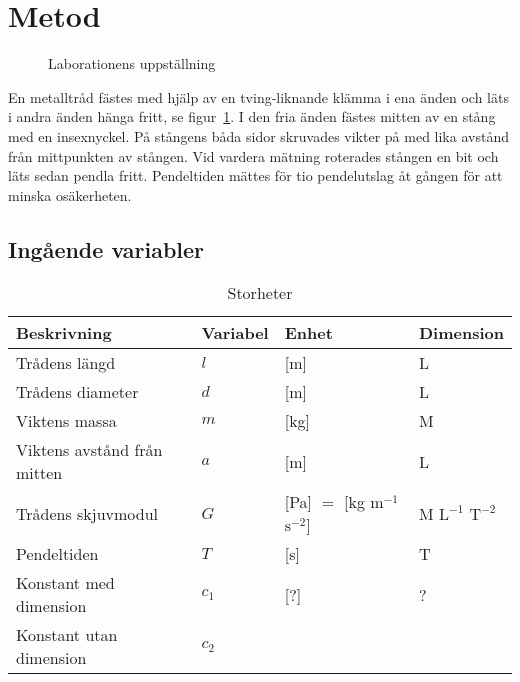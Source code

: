 \documentclass[a4paper,12pt]{article}
\begin{document}
\section{Metod}

\begin{figure}
\centering
{} 
\caption{Laborationens uppställning}
\label{fig:uppställning}
\end{figure}

En metalltråd fästes med hjälp av en tving-liknande klämma i ena änden och läts
i andra änden hänga fritt, se figur~\ref{fig:uppställning}. I den fria änden fästes
mitten av en stång med en insexnyckel. På stångens båda sidor skruvades vikter
på med lika avstånd från mittpunkten av stången. Vid vardera mätning roterades
stången en bit och läts sedan pendla fritt. Pendeltiden mättes för tio
pendelutslag åt gången för att minska osäkerheten.

\subsection{Ingående variabler}

\begin{table}[h!]
  \caption{Storheter}
  \label{tab:storheter}
  \begin{tabular} {| l | l | l | l |}
    \hline
    \textbf{Beskrivning} & \textbf{Variabel} & \textbf{Enhet} & \textbf{Dimension} \\\hline
    Trådens längd & $l$ & [m] & L \\\hline
    Trådens diameter & $d$ & [m] & L \\\hline
    Viktens massa & $m$ & [kg] & M \\\hline
    Viktens avstånd från mitten & $a$ & [m] & L \\\hline
    Trådens skjuvmodul & $G$ & [Pa] $=$ [kg $\mathrm{m}^{-1}$ $\mathrm{s}^{-2}$] & M $\mathrm{L}^{-1}$ $\mathrm{T}^{-2}$ \\\hline
    Pendeltiden & $T$ & [s] & T \\\hline
    Konstant med dimension & $c_1$ & [?] & ? \\\hline
    Konstant utan dimension & $c_2$ && \\\hline
  \end{tabular}
\end{table}
\end{document}
